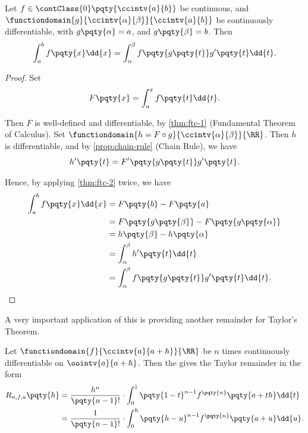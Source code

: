 \begin{proposition}
    \label{prop:integration-by-substitution}%
    Let \(f \in \contClass{0} \pqty{\ccintv{a}{b}}\) be continuous, and \(\functiondomain{g}{\ccintv{\alpha}{\beta}}{\ccintv{a}{b}}\) be continuously differentiable, with \(g\pqty{\alpha} = a\), and \(g\pqty{\beta} = b\). Then
    \[
        \int_{a}^{b} f\pqty{x} \dd{x} = \int_{\alpha}^{\beta} f\pqty{g\pqty{t}} g'\pqty{t} \dd{t}.
    \]
\end{proposition}

\begin{proof}
    Set
    \[
        F\pqty{x} = \int_{a}^{x} f\pqty{t} \dd{t}.
    \]
    
    Then \(F\) is well-defined and differentiable, by \autoref{thm:ftc-1} (Fundamental Theorem of Calculus). Set \(\functiondomain{h = F \circ g}{\ccintv{\alpha}{\beta}}{\RR}\). Then \(h\) is differentiable, and by \autoref{prop:chain-rule} (Chain Rule), we have
    \[
        h'\pqty{t} = F'\pqty{g\pqty{t}} g'\pqty{t}.
    \]

    Hence, by applying \autoref{thm:ftc-2} twice, we have
    \begin{align*}
        \int_{a}^{b} f\pqty{x} \dd{x} &= F\pqty{b} - F\pqty{a} \\
        &= F\pqty{g\pqty{\beta}} - F\pqty{g\pqty{\alpha}} \\
        &= h\pqty{\beta} - h\pqty{\alpha} \\
        &= \int_{\alpha}^{\beta} h'\pqty{t} \dd{t} \\
        &= \int_{\alpha}^{\beta} f\pqty{g\pqty{t}} g'\pqty{t} \dd{t}.
    \end{align*}
\end{proof}

A very important application of this is providing another remainder for Taylor's Theorem.

\begin{theorem}
    \label{thm:taylor-thm-integral-remainder}%
    Let \(\functiondomain{f}{\ccintv{a}{a + h}}{\RR}\) be \(n\) times continuously differentiable on \(\oointv{a}{a + h}\). Then the  gives the Taylor remainder in the form
    \begin{align*}
        R_{n, f, a} \pqty{h} &= \frac{h^{n}}{\pqty{n - 1}!} \cdot \int_{0}^{1} \pqty{1 - t}^{n - 1} f^{\pqty{n}} \pqty{a + th} \dd{t} \\
        &= \frac{1}{\pqty{n - 1}!} \cdot \int_{0}^{h} \pqty{h - u}^{n - 1} f^{\pqty{n}} \pqty{a + u} \dd{u}.
    \end{align*}
\end{theorem}

